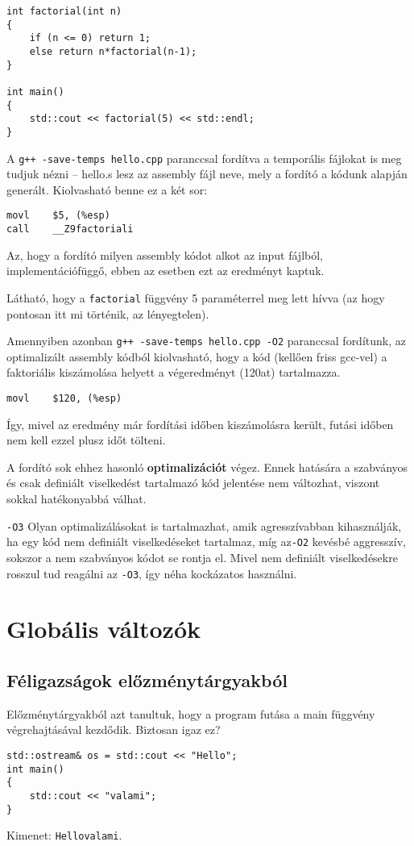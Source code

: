 \documentclass[a4paper,11.5pt,table]{article}
\begin{document}
	\begin{lstlisting}
int factorial(int n)
{
	if (n <= 0) return 1;
	else return n*factorial(n-1);
}

int main()
{
	std::cout << factorial(5) << std::endl;
}
	\end{lstlisting}
	
	A \texttt{g++ -save-temps hello.cpp} paranccsal fordítva a temporális fájlokat is meg tudjuk nézni -- hello.s lesz az assembly fájl neve, mely a fordító a kódunk alapján generált. Kiolvasható benne ez a két sor:
	\begin{lstlisting}[style = customasm]
movl 	$5, (%esp)
call	__Z9factoriali
	\end{lstlisting}
	\begin{note}
		Az, hogy a fordító milyen assembly kódot alkot az input fájlból, implementációfüggő, ebben az esetben ezt az eredményt kaptuk.
	\end{note}
	Látható, hogy a \texttt{factorial} függvény 5 paraméterrel meg lett hívva (az hogy pontosan itt mi történik, az lényegtelen).
	
	\medskip
	Amennyiben azonban \texttt{g++ -save-temps hello.cpp -O2} paranccsal fordítunk, az optimalizált assembly kódból kiolvasható, hogy a kód (kellően friss gcc-vel) a faktoriális kiszámolása helyett a végeredményt (120at) tartalmazza. 
	\begin{lstlisting}[style = customasm]
movl	$120, (%esp)
	\end{lstlisting}
	Így, mivel az eredmény már fordítási időben kiszámolásra került, futási időben nem kell ezzel plusz időt tölteni.
	
	A fordító sok ehhez hasonló \textbf{optimalizációt} végez. Ennek hatására a szabványos és csak definiált viselkedést tartalmazó kód jelentése nem változhat, viszont sokkal hatékonyabbá válhat.
	\begin{note}
		\texttt{-O3} Olyan optimalizálásokat is tartalmazhat, amik agresszívabban kihasználják, ha egy kód nem definiált viselkedéseket tartalmaz, míg az\texttt{-O2} kevésbé aggresszív, sokszor a nem szabványos kódot se rontja el. Mivel nem definiált viselkedésekre rosszul tud reagálni az \texttt{-O3}, így néha kockázatos használni.
	\end{note}
	\section{Globális változók}
	\subsection{Féligazságok előzménytárgyakból}
	Előzménytárgyakból azt tanultuk, hogy a program futása a main függvény végrehajtásával kezdődik. Biztosan igaz ez?
	\begin{lstlisting}
std::ostream& os = std::cout << "Hello";
int main()
{
	std::cout << "valami";
}
	\end{lstlisting}
	Kimenet: \texttt{Hellovalami}.
	\medskip
	
\end{document}
